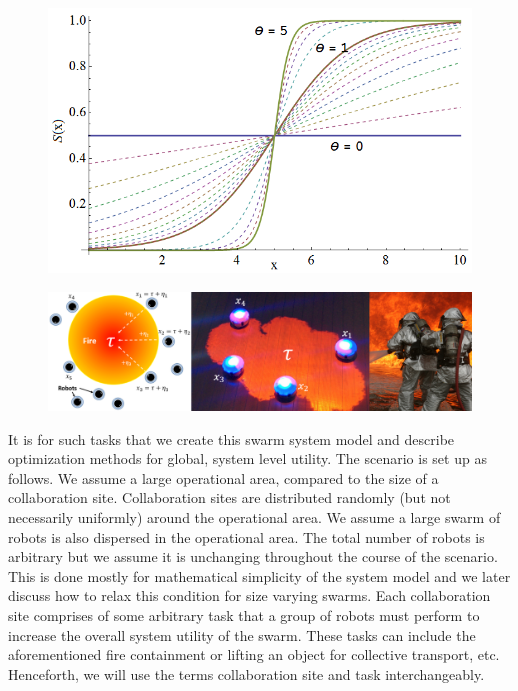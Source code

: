 \documentclass[conference]{IEEETran}
\begin{document}
\begin{figure}[!ht]
\centering\includegraphics[width=\columnwidth]{../figures/sigmoid1.png}
\centering\caption{}\label{fig:sigmoid}
\end{figure}

\begin{figure}[!ht]
\centering\includegraphics[width=\textwidth]{../figures/dropletfire.png}
\centering\caption{}\label{fig:dropletfire}
\end{figure}

It is for such tasks that we create this swarm system model and describe optimization methods for global, system level utility. The scenario is set up as follows. We assume a large operational area, compared to the size of a collaboration site. Collaboration sites are distributed randomly (but not necessarily uniformly) around the operational area. We assume a large swarm of robots is also dispersed in the operational area. The total number of robots is arbitrary but we assume it is unchanging throughout the course of the scenario. This is done mostly for mathematical simplicity of the system model and we later discuss how to relax this condition for size varying swarms. Each collaboration site comprises of some arbitrary task that a group of robots must perform to increase the overall system utility of the swarm. These tasks can include the aforementioned fire containment or lifting an object for collective transport, etc. Henceforth, we will use the terms collaboration site and task interchangeably.
\end{document}
